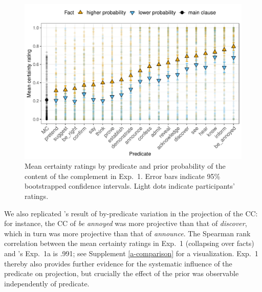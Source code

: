 \documentclass[11pt,fleqn]{article}
\newcommand{\6}{\mbox{$[\hspace*{-.6mm}[$}}
\newcommand{\9}{\mbox{$]\hspace*{-.6mm}]$}}
\newcommand{\citepos}[1]{\citeauthor{#1}'s \citeyear{#1}}
\begin{document}
\begin{figure}[h!]
\centering

\includegraphics[width=.7\paperwidth]{../../results/9-prior-projection/graphs/means-projectivity-by-predicate-and-prior}

\caption{Mean certainty ratings by predicate and prior probability of the content of the complement in Exp.~1. Error bars indicate 95\% bootstrapped confidence intervals. Light dots indicate participants' ratings.} 
\label{f-projection-mean}
\end{figure}

We also replicated 's result of by-predicate variation in the projection of the CC: for instance, the CC of {\em be annoyed} was more projective than that of {\em discover}, which in turn was more projective than that of {\em announce}. The Spearman rank correlation between the mean certainty ratings in Exp.~1 (collapsing over facts) and \citepos{tonhauser-degen-factive} Exp.~1a is .991; see Supplement \ref{a-comparison} for a visualization. Exp.~1 thereby also provides further evidence for the systematic influence of the predicate on projection, but crucially the effect of the prior was observable independently of predicate.
\end{document}
